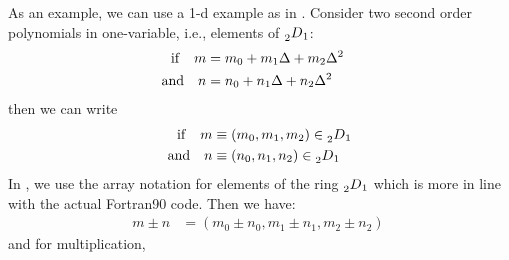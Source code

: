 \documentclass{hitec}     %
\begin{document}
As an example, we can use a 1-d example as in . Consider  two second order polynomials in one-variable, i.e., elements of $\prescript{}{2}{D}_{1}$:
%
\begin{align}~{\rm i}{\rm f}~~~m&={m}_{0}+{m}_{1}\Delta +{m}_{2}{\Delta }^{2}\ \ \ \nonumber \\
 {\rm a}{\rm n}{\rm d} ~~~n&={n}_{0}+{n}_{1}\Delta +{n}_{2}{\Delta }^{2}\ \ \ \ \label{eq:nodnv}\end{align}
then we can write
%
\begin{align}~{\rm i}{\rm f}~~~m&\equiv \left({{m}_{0},{m}_{1},{m}_{2}}\right)\in \prescript{}{2}{D}_{1}\nonumber \\
 {\rm a}{\rm n}{\rm d} ~~~n&\equiv \left({{n}_{0},{n}_{1},{n}_{2}}\right)\in \prescript{}{2}{D}_{1}\label{eq:nodnv1}\end{align}
%
 In , we use the array notation for elements of the ring $\prescript{}{2}{D}_{1}$ which is more in line with the actual Fortran90 code.
Then we have:
%
\begin{align}m\pm n&=\left({{m}_{0}\pm {n}_{0},{m}_{1}\pm {n}_{1},{m}_{2}\pm {n}_{2}}\right)\ \label{eq:nodnvpm}\end{align}
and for multiplication,
%
\end{document}
